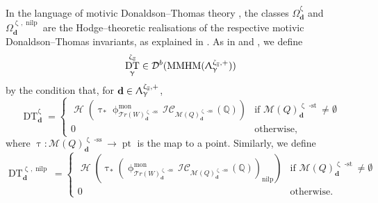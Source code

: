 \documentclass[a4paper,10pt]{amsart}
\newcommand{\dd}{\mathbf{d}}
\newcommand{\QQ}{\mathbb{Q}}
\newcommand{\WW}{\mathcal{T}r(W)}
\newcommand{\Msp}{\mathcal{M}}
\newcommand{\ICS}{\mathcal{IC}}
\newcommand{\phim}[1]{\phi^{\mon}_{#1}}
\renewcommand{\gamma}{\upgamma}
\renewcommand{\zeta}{\upzeta}
\renewcommand{\Lambda}{\Uplambda}
\renewcommand{\phi}{\upphi}
\renewcommand{\tau}{\uptau}
\DeclareMathOperator{\sst}{-ss}
\DeclareMathOperator{\nilp}{nilp}
\DeclareMathOperator{\st}{-st}
\DeclareMathOperator{\mon}{mon}
\DeclareMathOperator{\MMHM}{MMHM}
\DeclareMathOperator{\DT}{DT}
\DeclareMathOperator{\pt}{pt}
\DeclareMathOperator{\Ss}{\overline{s}}
\DeclareMathOperator{\Ho}{\mathcal{H}}
\newcommand{\Db}{\mathcal{D}^{b}}
\begin{document}
In the language of motivic Donaldson--Thomas theory \cite{KS}, the classes $\Omega_{\dd}^{\zeta_{\Ss}}$ and $\Omega_{\dd}^{\zeta_{\Ss},\nilp}$ are the Hodge--theoretic realisations of the respective motivic Donaldson--Thomas invariants, as explained in \cite{COHA}.  As in \cite{DaMe4} and \cite{DaMe15b}, we define
\[
\DT_{\gamma}^{\zeta_{\Ss}}\in\Db(\MMHM(\Lambda_{\gamma}^{\zeta_{\Ss},+}))
\]
by the condition that, for $\dd\in\Lambda_{\gamma}^{\zeta_{\Ss},+}$, 
\begin{equation*}
\DT_{\dd}^{\zeta_{\Ss}}=\begin{cases}\Ho\left(\tau_*\phim{\WW^{\zeta_{\Ss}\sst}_{\dd}}\ICS_{\Msp(Q)_{\dd}^{\zeta_{\Ss}\sst}}(\QQ)\right)& \textrm{if }\Msp(Q)_{\dd}^{\zeta_{\Ss}\st}\neq\emptyset\\ 0&\textrm{otherwise,}\end{cases}
\end{equation*}
where $\tau:\Msp(Q)^{\zeta_{\Ss}\sst}_{\dd}\rightarrow\pt$ is the map to a point.  Similarly, we define
\begin{equation*}
\DT_{\dd}^{\zeta_{\Ss},\nilp}=\begin{cases}\Ho\left(\tau_*\left(\phim{\WW^{\zeta_{\Ss}\sst}_{\dd}}\ICS_{\Msp(Q)_{\dd}^{\zeta_{\Ss}\sst}}(\QQ)\right)_{\nilp}\right)& \textrm{if }\Msp(Q)_{\dd}^{\zeta_{\Ss}\st}\neq\emptyset\\ 0&\textrm{otherwise.}\end{cases}
\end{equation*}
\end{document}
